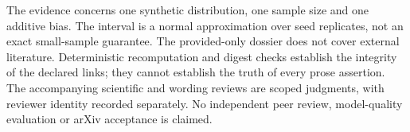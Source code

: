 The evidence concerns one synthetic distribution, one sample size and one
additive bias. The interval is a normal approximation over
 seed replicates, not an exact small-sample guarantee.
The provided-only dossier does not cover external literature. Deterministic
recomputation and digest checks establish the integrity of the declared links;
they cannot establish the truth of every prose assertion. The accompanying
scientific and wording reviews are scoped judgments, with reviewer identity
recorded separately. No independent peer review, model-quality evaluation or
arXiv acceptance is claimed.
